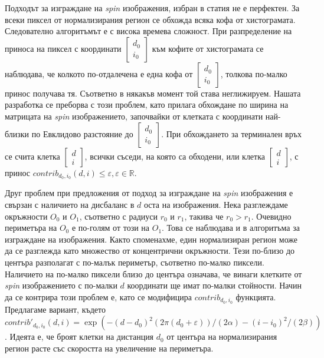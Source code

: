 \documentclass[a4paper,12pt]{article}
\begin{document}
Подходът за изграждане на \textit{spin} изображения, избран в статия \cite{spinimages} не е перфектен. За всеки пиксел от нормализирания регион се обхожда всяка кофа от хистограмата. Следователно алгоритъмът е с висока времева сложност. При разпределение на приноса на пиксел с координати $\begin{bmatrix} d_0 \\ i_0 \end{bmatrix}$ към кофите от хистограмата се наблюдава, че колкото по-отдалечена е една кофа от $\begin{bmatrix} d_0 \\ i_0 \end{bmatrix}$, толкова по-малко принос получава тя. Съответно в някакъв момент той става неглижируем. Нашата разработка се преборва с този проблем, като прилага обхождане по ширина на матрицата на \textit{spin} изображението, започвайки от клетката с координати най-близки по Евклидово разстояние до $\begin{bmatrix} d_0 \\ i_0 \end{bmatrix}$. При обхождането за терминален връх се счита клетка $\begin{bmatrix} d \\ i \end{bmatrix}$, всички съседи, на която са обходени, или клетка $\begin{bmatrix} d \\ i \end{bmatrix}$, с принос $contrib_{d_0,i_0}(d, i) \leq \varepsilon, \varepsilon \in \mathbb{R}$.

\bigbreak

Друг проблем при предложения от \cite{spinimages} подход за изграждане на \textit{spin} изображения е свързан с наличието на дисбаланс в $d$ оста на изображения. Нека разглеждаме окръжности $O_0$ и $O_1$, съответно с радиуси $r_0$ и $r_1$, такива че $r_0 > r_1$. Очевидно периметъра на $O_0$ е по-голям от този на $O_1$. Това се наблюдава и в алгоритъма за изграждане на \cite{spinimages} изображения. Както споменахме, един нормализиран регион може да се разглежда като множество от концентрични окръжности. Тези по-близо до центъра разполагат с по-малък периметър, съответно по-малко пиксели. Наличието на по-малко пиксели близо до центъра означава, че винаги клетките от \textit{spin} изображението с по-малки $d$ координати ще имат по-малки стойности. Начин да се контрира този проблем е, като се модифицира $contrib_{d_0,i_0}$ функцията. Предлагаме вариант, където $contrib'_{d_0,i_0}(d, i) = \exp(-(d-d_0)^2(2\pi(d_0+\varepsilon))/(2\alpha) - (i-i_0)^2/(2\beta))$. Идеята е, че броят клетки на дистанция $d_0$ от центъра на нормализирания регион расте със скоростта на увеличение на периметъра.
\end{document}
